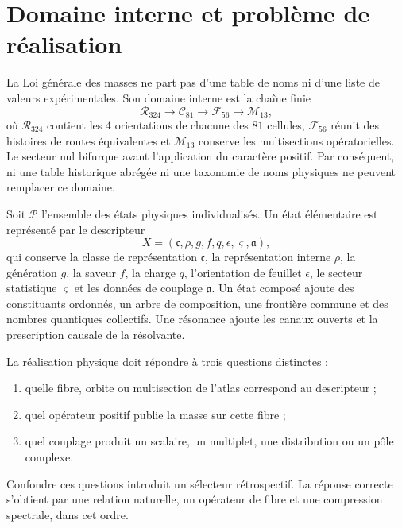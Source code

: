 \section{Domaine interne et problème de réalisation}

La Loi générale des masses ne part pas d'une table de noms ni d'une liste de
valeurs expérimentales. Son domaine interne est la chaîne finie
\[
 \mathcal R_{324}\longrightarrow \mathcal C_{81}
 \longrightarrow \mathcal F_{56}\longrightarrow \mathcal M_{13},
\]
où \(\mathcal R_{324}\) contient les \(4\) orientations de chacune des
\(81\) cellules, \(\mathcal F_{56}\) réunit des histoires de routes équivalentes et
\(\mathcal M_{13}\) conserve les multisections opératorielles. Le secteur nul
bifurque avant l'application du caractère positif. Par conséquent, ni une table
historique abrégée ni une taxonomie de noms physiques ne peuvent remplacer ce
domaine.

Soit \(\mathcal P\) l'ensemble des états physiques individualisés. Un état
élémentaire est représenté par le descripteur
\[
 X=(\mathfrak c,\rho,g,f,q,\epsilon,\varsigma,\mathfrak a),
\]
qui conserve la classe de représentation \(\mathfrak c\), la représentation interne
\(\rho\), la génération \(g\), la saveur \(f\), la charge \(q\), l'orientation de feuillet
\(\epsilon\), le secteur statistique \(\varsigma\) et les données de couplage
\(\mathfrak a\). Un état composé ajoute des constituants ordonnés, un arbre de
composition, une frontière commune et des nombres quantiques collectifs. Une résonance
ajoute les canaux ouverts et la prescription causale de la résolvante.

La réalisation physique doit répondre à trois questions distinctes :

\begin{enumerate}
\item quelle fibre, orbite ou multisection de l'atlas correspond au descripteur ;
\item quel opérateur positif publie la masse sur cette fibre ;
\item quel couplage produit un scalaire, un multiplet, une distribution ou
      un pôle complexe.
\end{enumerate}

Confondre ces questions introduit un sélecteur rétrospectif. La réponse
correcte s'obtient par une relation naturelle, un opérateur de fibre et une
compression spectrale, dans cet ordre.

